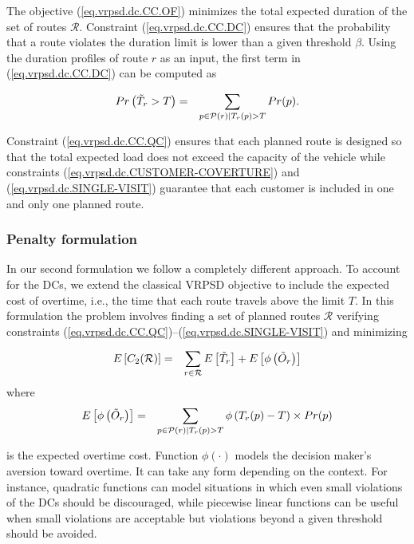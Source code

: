 The objective (\ref{eq.vrpsd.dc.CC.OF}) minimizes the total expected duration of the set of routes $\mathcal{R}$. Constraint (\ref{eq.vrpsd.dc.CC.DC}) ensures that the probability that a route violates the duration limit is lower than a given threshold $\beta$. Using the duration profiles of route $r$ as an input, the first term in (\ref{eq.vrpsd.dc.CC.DC}) can be computed as

\begin{eqnarray}\label{eq.vrpsd.dc.CC.pr}
\small
\label{eq.vrpsd.dc.CC.DC-COMPUTATION} Pr\left(\tilde{T}_r> T\right)&=&\sum_{p\in \mathcal{P}(r)|T_{r}(p)>T}Pr(p).
\end{eqnarray}

\noindent Constraint (\ref{eq.vrpsd.dc.CC.QC}) ensures that each planned route is designed so that the total expected load does not exceed the capacity of the vehicle while constraints (\ref{eq.vrpsd.dc.CUSTOMER-COVERTURE}) and (\ref{eq.vrpsd.dc.SINGLE-VISIT}) guarantee that each customer is included in one and only one planned route.

\subsubsection{Penalty formulation}\label{s.vrpsd.dc.P}

In our second formulation we follow a completely different approach. To account for the DCs, we extend the classical VRPSD objective to include the expected cost of overtime, i.e., the time that each route travels above the limit $T$. In this formulation the problem involves finding a set of planned routes $\mathcal{R}$ verifying constraints (\ref{eq.vrpsd.dc.CC.QC})--(\ref{eq.vrpsd.dc.SINGLE-VISIT}) and minimizing

\begin{eqnarray}\label{eq.vrpsd.dc.P}
\small
\label{eq.vrpsd.dc.P.OF} E\left[C_2(\mathcal{R})\right] &=&\sum_{r\in\mathcal{R}}E\left[\tilde{T}_r\right] + E\left[\phi\left(\tilde{O}_r\right)\right]
\end{eqnarray}
\noindent where
\begin{eqnarray}
\small
\label{eq.vrpsd.dc.phi}
E\left[\phi\left(\tilde{O}_r\right)\right] & = & \sum_{p\in \mathcal{P}(r)|T_{r}(p)>T}\phi\left(T_{r}(p)-T\right)\times Pr(p)
\end{eqnarray}

\noindent is the expected overtime cost. Function $\phi(\cdot)$ models the decision maker's aversion toward overtime. It can take any form depending on the context. For instance, quadratic functions can model situations in which even small violations of the DCs should be discouraged, while piecewise linear functions can be useful when small violations are acceptable but violations beyond a given threshold should be avoided.

